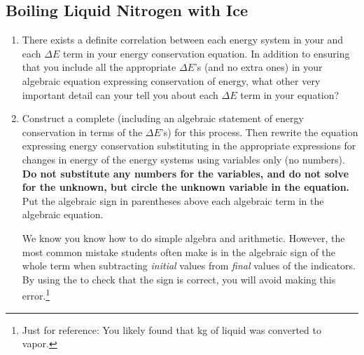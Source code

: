 \label{act1.2.4}


\subsection{Boiling Liquid Nitrogen with Ice}  

\begin{fnt}
	
\end{fnt}


\begin{enumerate}
	\item There exists a definite correlation between each energy system in your \EnergyDiagram{} and each $\Delta E$ term in your energy conservation equation. In addition to ensuring that you include all the appropriate $\Delta E$'s (and no extra ones) in your algebraic equation expressing conservation of energy, what other very important detail can your \EnergyDiagram{} tell you about each $\Delta E$ term in your equation?
	
	\item Construct a complete \EnergyDiagram{} (including an algebraic statement of energy conservation in terms of the $\Delta E$'s) for this process. Then rewrite the equation expressing energy conservation substituting in the appropriate expressions for changes in energy of the energy systems using variables only (no numbers). \textbf{Do not substitute any numbers for the variables, and do not solve for the unknown, but circle the unknown variable in the equation.} Put the algebraic sign in parentheses above each algebraic term in the algebraic equation.

	We know you know how to do simple algebra and arithmetic. However, the most common mistake students often make is in the algebraic sign of the whole term when subtracting \emph{initial} values from \emph{final} values of the indicators. By using the \EnergyDiagram{} to check that the sign is correct, you will avoid making this error.\footnote{Just for reference: You likely found that \about\unit[4]{kg} of liquid  was converted to vapor.}

\end{enumerate}

